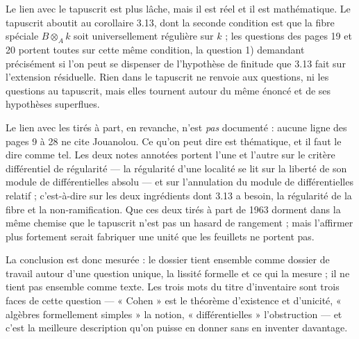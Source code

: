 \documentclass[11pt,a4paper]{article}
\begin{document}
Le lien avec le tapuscrit est plus lâche, mais il est réel et il est
mathématique. Le tapuscrit aboutit au corollaire 3.13, dont la seconde
condition est que la fibre spéciale $B \otimes_A k$ soit universellement
régulière sur $k$ ; les questions des pages 19 et 20 portent toutes sur cette
même condition, la question 1) demandant précisément si l'on peut se dispenser
de l'hypothèse de finitude que 3.13 fait sur l'extension résiduelle. Rien dans
le tapuscrit ne renvoie aux questions, ni les questions au tapuscrit, mais elles
tournent autour du même énoncé et de ses hypothèses superflues.

Le lien avec les tirés à part, en revanche, n'est \emph{pas} documenté : aucune
ligne des pages 9 à 28 ne cite Jouanolou. Ce qu'on peut dire est thématique, et
il faut le dire comme tel. Les deux notes annotées portent l'une et l'autre sur
le critère différentiel de régularité — la régularité d'une localité se lit sur
la liberté de son module de différentielles absolu — et sur l'annulation du
module de différentielles relatif ; c'est-à-dire sur les deux ingrédients dont
3.13 a besoin, la régularité de la fibre et la non-ramification. Que ces deux
tirés à part de 1963 dorment dans la même chemise que le tapuscrit n'est pas un
hasard de rangement ; mais l'affirmer plus fortement serait fabriquer une unité
que les feuillets ne portent pas.

La conclusion est donc mesurée : le dossier tient ensemble comme dossier de
travail autour d'une question unique, la lissité formelle et ce qui la mesure ;
il ne tient pas ensemble comme texte. Les trois mots du titre d'inventaire sont
trois faces de cette question — « Cohen » est le théorème d'existence et
d'unicité, « algèbres formellement simples » la notion, « différentielles »
l'obstruction — et c'est la meilleure description qu'on puisse en donner sans
en inventer davantage.
\end{document}
